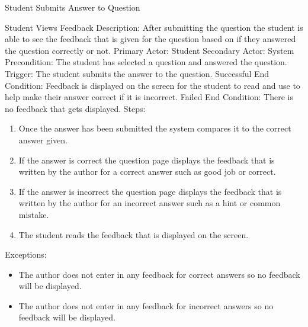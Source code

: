     
    
    \begin{section}{Student Submits Answer to Question}
    
    
    

    
    \begin{section}{Student Views Feedback}
        Description: After submitting the question the student is able to see the feedback that is given for the 
        question based on if they answered the question correctly or not. \newline
        Primary Actor: Student \newline
        Secondary Actor: System \newline
        Precondition: The student has selected a question and answered the question. \newline
        Trigger: The student submits the answer to the question. \newline
        Successful End Condition: Feedback is displayed on the screen for the student 
        to read and use to help make their answer correct if it is incorrect. \newline
        Failed End Condition: There is no feedback that gets displayed. \newline
        \newline
        Steps:
        \begin{enumerate}
            \item{Once the answer has been submitted the system compares it to the correct answer given.}
            \item{If the answer is correct the question page displays the feedback that is 
            written by the author for a correct answer such as good job or correct.}
            \item{If the answer is incorrect the question page displays the feedback that is 
            written by the author for an incorrect answer such as a hint or common mistake.}
            \item{The student reads the feedback that is displayed on the screen.}
        \end{enumerate}
        Exceptions:
        \begin{itemize}
            \item{The author does not enter in any feedback for correct answers so no feedback will be displayed.}
            \item{The author does not enter in any feedback for incorrect answers so no feedback will be displayed.}
        \end{itemize}
    \end{section}
        

\end{section}
